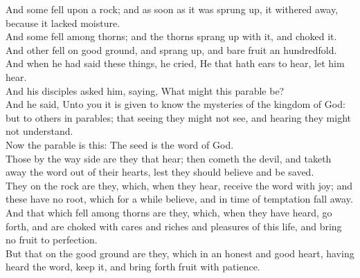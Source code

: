 \documentclass[10pt]{article} %
\begin{document}
{\begin{minipage}[t]{0.45\textwidth}
And some fell upon a rock; and as soon as it was sprung up, it withered away, because it lacked moisture.\\
And some fell among thorns; and the thorns sprang up with it, and choked it.\\
And other fell on good ground, and sprang up, and bare fruit an hundredfold. And when he had said these things, he cried, He that hath ears to hear, let him hear.\\
And his disciples asked him, saying, What might this parable be?\\
And he said, Unto you it is given to know the mysteries of the kingdom of God: but to others in parables; that seeing they might not see, and hearing they might not understand.\\
Now the parable is this: The seed is the word of God.\\
Those by the way side are they that hear; then cometh the devil, and taketh away the word out of their hearts, lest they should believe and be saved.\\
They on the rock are they, which, when they hear, receive the word with joy; and these have no root, which for a while believe, and in time of temptation fall away.\\
And that which fell among thorns are they, which, when they have heard, go forth, and are choked with cares and riches and pleasures of this life, and bring no fruit to perfection.\\
But that on the good ground are they, which in an honest and good heart, having heard the word, keep it, and bring forth fruit with patience.\\
\end{minipage}}
\newpage\huge
\singlespacing
\end{document}
